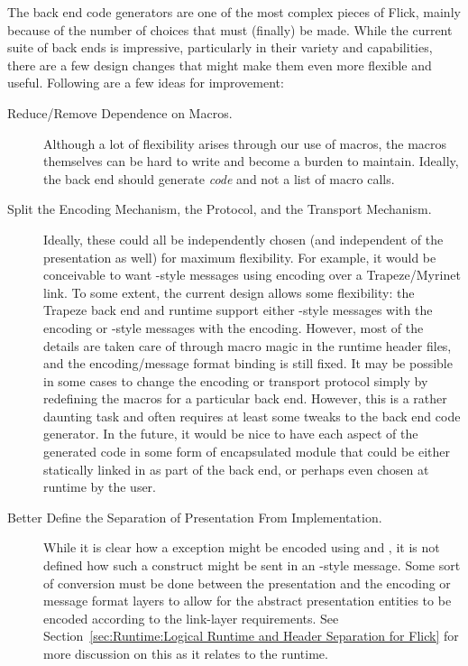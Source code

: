 The back end code generators are one of the most complex pieces of Flick,
mainly because of the number of choices that must (finally) be made.  While the
current suite of back ends is impressive, particularly in their variety and
capabilities, there are a few design changes that might make them even more
flexible and useful.  Following are a few ideas for improvement:

\begin{description}
  \item[Reduce/Remove Dependence on Macros.]
  Although a lot of flexibility arises through our use of macros, the macros
  themselves can be hard to write and become a burden to maintain.  Ideally,
  the back end should generate \emph{code} and not a list of macro calls.

  \item[Split the Encoding Mechanism, the Protocol, and the Transport
  Mechanism.]
  Ideally, these could all be independently chosen (and independent of the
  presentation as well) for maximum flexibility.  For example, it would be
  conceivable to want \ONCRPC{}-style messages using \CDR{} encoding over a
  Trapeze/Myrinet link.  To some extent, the current design allows some
  flexibility: the Trapeze back end and runtime support either \IIOP{}-style
  messages with the \CDR{} encoding or \ONCRPC{}-style messages with the \XDR{}
  encoding.  However, most of the details are taken care of through macro magic
  in the runtime header files, and the encoding/message format binding is still
  fixed.  It may be possible in some cases to change the encoding or transport
  protocol simply by redefining the macros for a particular back end.  However,
  this is a rather daunting task and often requires at least some tweaks to the
  back end code generator.  In the future, it would be nice to have each aspect
  of the generated code in some form of encapsulated module that could be
  either statically linked in as part of the back end, or perhaps even chosen
  at runtime by the user.

  \item[Better Define the Separation of Presentation From Implementation.]
  While it is clear how a \CORBA{} exception might be encoded using \IIOP{} and
  \CDR{}, it is not defined how such a construct might be sent in an
  \ONCRPC{}-style message.  Some sort of conversion must be done between the
  presentation and the encoding or message format layers to allow for the
  abstract presentation entities to be encoded according to the link-layer
  requirements.  See Section~\ref{sec:Runtime:Logical Runtime and Header
  Separation for Flick} for more discussion on this as it relates to the
  runtime.
\end{description}




